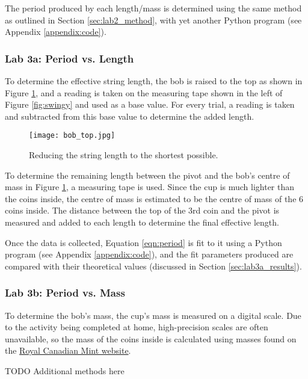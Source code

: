 \documentclass[aps,twocolumn,secnumarabic,nobalancelastpage,amsmath,amssymb,nofootinbib,floatfix,letterpaper]{revtex4}
\begin{document}
The period produced by each length/mass is determined using the same method as outlined in Section
\ref{sec:lab2_method}, with yet another Python program (see Appendix \ref{appendix:code}).

\subsubsection{Lab 3a: Period vs. Length}

To determine the effective string length, the bob is raised to the top as shown in Figure \ref{fig:raised_bob}, and a
reading is taken on the measuring tape shown in the left of Figure \ref{fig:swingy} and used as a base value. For
every trial, a reading is taken and subtracted from this base value to determine the added length.

\begin{figure}[htb]
    \texttt{[image: bob\_top.jpg]}
    \caption{Reducing the string length to the shortest possible.}
    \label{fig:raised_bob}
\end{figure}

To determine the remaining length between the pivot and the bob's centre of mass in Figure \ref{fig:raised_bob}, a
measuring tape is used. Since the cup is much lighter than the coins inside, the centre of mass is estimated to be the
centre of mass of the 6 coins inside. The distance between the top of the 3rd coin and the pivot is measured and added
to each length to determine the final effective length.

Once the data is collected, Equation \ref{eqn:period} is fit to it using a Python program
(see Appendix \ref{appendix:code}), and the fit parameters produced are compared with their theoretical values
(discussed in Section \ref{sec:lab3a_results}).

\subsubsection{Lab 3b: Period vs. Mass}

To determine the bob's mass, the cup's mass is measured on a digital scale. Due to the activity being completed at home,
high-precision scales are often unavailable, so the mass of the coins inside is calculated using masses found on the
\href{https://www.mint.ca/store/mint/learn/canadian-circulation-1100028}{Royal Canadian Mint website}.

TODO Additional methods here

\end{document}
